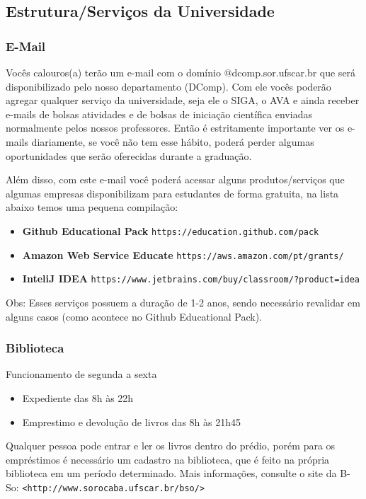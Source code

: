 \subsection{Estrutura/Serviços da Universidade}

\subsubsection{E-Mail}
Vocês calouros(a) terão um e-mail com o domínio @dcomp.sor.ufscar.br que será disponibilizado pelo nosso departamento (DComp). Com ele vocês poderão agregar qualquer serviço da universidade, seja ele o SIGA, o AVA e ainda receber e-mails de bolsas atividades e de bolsas de iniciação científica enviadas normalmente pelos nossos professores. Então é estritamente importante ver os e-mails diariamente, se você não tem esse hábito, poderá perder algumas oportunidades que serão oferecidas durante a graduação.

Além disso, com este e-mail você poderá acessar alguns produtos/serviços que algumas empresas disponibilizam para estudantes de forma gratuita, na lista abaixo temos uma pequena compilação:
\begin{itemize}
  \item \textbf{Github Educational Pack} \texttt{https://education.github.com/pack}
  \item \textbf{Amazon Web Service Educate} \texttt{https://aws.amazon.com/pt/grants/}
  \item \textbf{InteliJ IDEA} \texttt{https://www.jetbrains.com/buy/classroom/?product=idea}
\end{itemize}

Obs: Esses serviços possuem a duração de 1-2 anos, sendo necessário revalidar em alguns casos (como acontece no Github Educational Pack).

\subsubsection{Biblioteca}
\noindent Funcionamento de segunda a sexta
\begin{itemize}
  \item Expediente das 8h às 22h
  \item Emprestimo e devolução de livros das 8h às 21h45
\end{itemize}
\noindent Qualquer pessoa pode entrar e ler os livros dentro do prédio, porém para os empréstimos é necessário um cadastro na biblioteca, que é feito na própria biblioteca em um período determinado.
\newline \newline Mais informações, consulte o site da B-So:
\texttt{<http://www.sorocaba.ufscar.br/bso/>}

